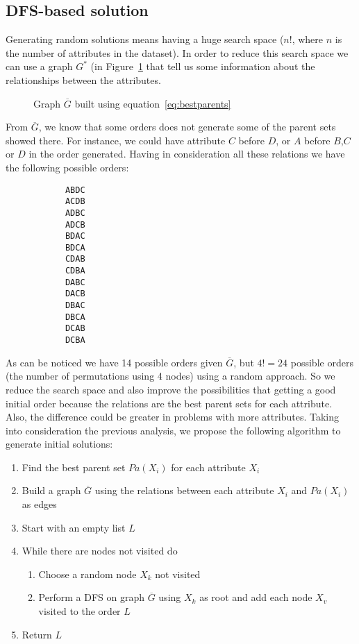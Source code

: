 \subsection{DFS-based solution}
\label{subsec:dfsapproach}
	Generating random solutions means having a huge search space ($n!$, where $n$ is the number of attributes in the dataset). In order to reduce this search space we can use a graph $G^*$ (in Figure~\ref{fig:example} that tell us some information about the relationships between the attributes.
	\begin{figure}[H]
		\centering
		
		\caption{Graph $\overline{G}$ built using equation~\ref{eq:bestparents} }
		\label{fig:example}
	\end{figure}
	From $\overline{G}$, we know that some orders does not generate some of the parent sets showed there. For instance, we could have attribute $C$ before $D$, or $A$ before $B$,$C$ or $D$ in the order generated. Having in consideration all these relations we have the following possible orders:
	\begin{multicols}{7}
		\begin{verbatim}
			ABDC
			ACDB
			ADBC
			ADCB
			BDAC
			BDCA
			CDAB
			CDBA
			DABC
			DACB
			DBAC
			DBCA
			DCAB
			DCBA
		\end{verbatim}
	\end{multicols}
	As can be noticed we have 14 possible orders given $\overline{G}$, but $4! = 24$ possible orders (the number of permutations using 4 nodes) using a random approach. So we reduce the search space and also improve the possibilities that getting a good initial order because the relations are the best parent sets for each attribute. Also, the difference could be greater in problems with more attributes.
	Taking into consideration the previous analysis, we propose the following algorithm to generate initial solutions:
	\begin{enumerate}
		\item Find the best parent set ${Pa}( X_i )$ for each attribute $X_i$
		\item Build a graph $\overline{G}$ using the relations between each attribute $X_i$ and ${Pa}( X_i )$ as edges
		\item Start with an empty list $L$
		\item While there are nodes not visited do
		\begin{enumerate}
			\item Choose a random node $X_k$ not visited
			\item Perform a DFS on graph $\overline{G}$ using $X_k$ as root and add each node $X_v$ visited to the order $L$
		\end{enumerate}
		\item Return $L$
	\end{enumerate}
	
